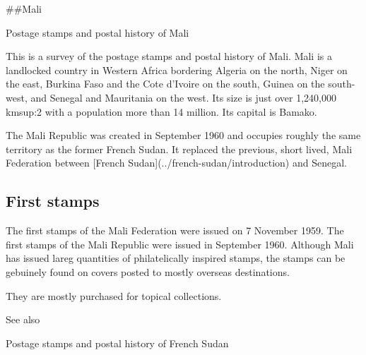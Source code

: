 \#\#Mali

Postage stamps and postal history of Mali



This is a survey of the postage stamps and postal history of Mali.
Mali is a landlocked country in Western Africa bordering Algeria on the north, Niger on the east, Burkina Faso and the Cote d'Ivoire on the south, Guinea on the south-west, and Senegal and Mauritania on the west. Its size is just over 1,240,000 kmsup:2 with a population more than 14 million. Its capital is Bamako.

The Mali Republic was created in September 1960 and occupies roughly the same territory as the former French Sudan. It replaced the previous, short lived, Mali Federation between [French Sudan](../french-sudan/introduction) and Senegal.


\subsection{First stamps}




The first stamps of the Mali Federation were issued on 7 November 1959. The first stamps of the Mali Republic were issued in September 1960. Although Mali has issued lareg quantities of philatelically inspired stamps, the stamps can be gebuinely found on covers posted to mostly overseas destinations.


They are mostly purchased for topical collections.

See also

Postage stamps and postal history of French Sudan








                